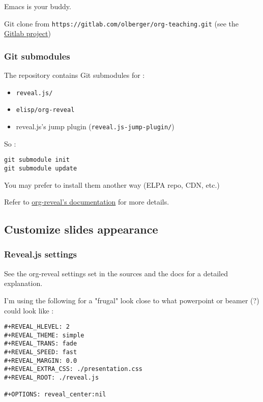 \documentclass[a4paper]{article}
\begin{document}
Emacs is your buddy.

Git clone from \texttt{https://gitlab.com/olberger/org-teaching.git} (see the \href{https://gitlab.com/olberger/org-teaching}{Gitlab project})

\subsubsection{Git submodules}
\label{sec:orge2a24e1}

The repository contains Git submodules for :
\begin{itemize}
\item \texttt{reveal.js/}
\item \texttt{elisp/org-reveal}
\item reveal.js's jump plugin (\texttt{reveal.js-jump-plugin/})
\end{itemize}

So :
\begin{verbatim}
git submodule init
git submodule update
\end{verbatim}
You may prefer to install them another way (ELPA repo, CDN, etc.)

\begin{NOTES}
Refer to \href{https://github.com/yjwen/org-reveal/\#requirements-and-installation}{org-reveal's documentation} for more details.
\end{NOTES}

\subsection{Customize slides appearance}
\label{sec:org1c81d74}

\subsubsection{Reveal.js settings}
\label{sec:org60b90ac}

See the org-reveal settings set in the sources and the docs for a detailed explanation.

I'm using the following for a "frugal" look close to what
powerpoint or beamer (?) could look like :

\begin{verbatim}
#+REVEAL_HLEVEL: 2
#+REVEAL_THEME: simple
#+REVEAL_TRANS: fade
#+REVEAL_SPEED: fast
#+REVEAL_MARGIN: 0.0
#+REVEAL_EXTRA_CSS: ./presentation.css
#+REVEAL_ROOT: ./reveal.js

#+OPTIONS: reveal_center:nil 
\end{verbatim}
\end{document}
